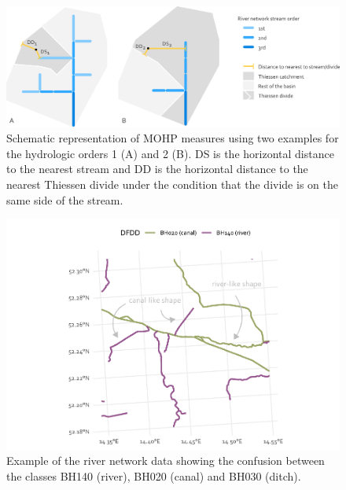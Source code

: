 \documentclass[fleqn,10pt]{wlscirep}
\begin{document}
\normalsize

\footnotesize

\begin{figure}[H]

{\centering \includegraphics[width=1\linewidth]{data_descriptor/tex/mohp_scheme} 

}

\caption{Schematic representation of MOHP measures using two examples for the hydrologic orders 1 (A) and 2 (B). DS is the horizontal distance to the nearest stream and DD is the horizontal distance to the nearest Thiessen divide under the condition that the divide is on the same side of the stream.}\label{fig:schematicmohp}
\end{figure}

\normalsize

\footnotesize

\begin{figure}[H]

{\centering \includegraphics[width=0.8\linewidth]{data_descriptor/tex/figure-rivercanalconfusionplot-1} 

}

\caption{Example of the river network data showing the confusion between the classes BH140 (river), BH020 (canal) and BH030 (ditch).}\label{fig:rivercanalconfusionplot}
\end{figure}
\end{document}
